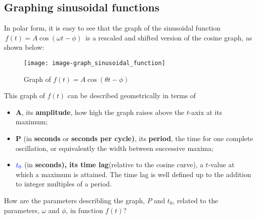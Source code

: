 \subsection{Graphing sinusoidal functions}
In polar form, it is easy to see that the graph of the sinusoidal function
$\, f(t)=A \cos (\omega t-\phi )\,$
is a rescaled and shifted version of the cosine graph, as shown below:

\begin{figure}[ht!]
  \centering
  \texttt{[image: image-graph\_sinusoidal\_function]}
  \caption{Graph of $f(t) = A \cos \left( \theta t - \phi \right)$}
\end{figure}

This graph of $f(t)$ can be described geometrically in terms of
\begin{itemize}
\item \textbf{\color{blue} A}, its \textbf{\color{blue} amplitude}, how high the graph raises above
  the $t$-axix at its maximum;
\item \textbf{\color{blue} P} (in \textbf{\color{orange} seconds} or \textbf{\color{orange}seconds per cycle)},
  its \textbf{\color{blue} period}, the time for one complete oscillation, or equivalently the width between successive maxima;
\item ${\color{blue} t_0}$ (in \textbf{\color{orange} seconds), its \textbf{\color{blue}} time lag}(relative to the cosine curve),
  a $t$-value at which a maximum is attained. The time lag is well defined up to the addition to integer multiples of a period.
\end{itemize}

\begin{question}
  How are the parameters describling the graph, $P$ and $t_0$, related to the parameters,
  $\omega$ and $\phi$, in function $f(t)$?
\end{question}
\Answer \\

  

